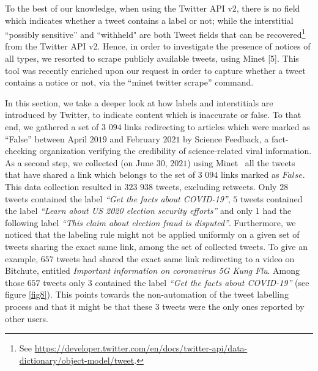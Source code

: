 \documentclass{article}
\begin{document}
\smallskip

To the best of our knowledge, when using the Twitter API v2, there is no field which indicates whether a tweet contains a label or not; while the interstitial ``possibly sensitive'' and ``withheld" are both Tweet fields that can be recovered\footnote{See \href{https://developer.twitter.com/en/docs/twitter-api/data-dictionary/object-model/tweet}{https://developer.twitter.com/en/docs/twitter-api/data-dictionary/object-model/tweet}.} from the Twitter API v2. Hence, in order to investigate the presence of notices of all types, we resorted to scrape publicly available tweets, using Minet [5]. This tool was recently enriched upon our request in order to capture whether a tweet contains a notice or not, via the ``minet twitter scrape'' command.

\smallskip

In this section, we take a deeper look at how labels and interstitials are introduced by Twitter, to indicate content which is inaccurate or false. To that end, we gathered a set of $3$ $094$ links redirecting to articles which were marked as ``False'' between April $2019$ and February $2021$ by Science Feedback, a fact-checking organization verifying the credibility of science-related viral information. 
As a second step, we collected (on June $30$, $2021$) using Minet~\cite{minet} all the tweets that have shared a link which belongs to the set of $3$ $094$ links marked as $False$. This data collection resulted in $323$ $938$ tweets, excluding retweets. Only $28$ tweets contained the label { \it ``Get the facts about COVID-19''}, $5$ tweets contained the label {\it ``Learn about US 2020 election security efforts''} and only $1$ had the following label {\it ``This claim about election fraud is disputed''}. Furthermore, we noticed that the labeling rule might not be applied uniformly on a given set of tweets sharing the exact same link, among the set of collected tweets. To give an example, $657$ tweets had shared the exact same link redirecting to a video on Bitchute, entitled {\it Important information on coronavirus 5G Kung Flu}. Among those $657$ tweets only $3$ contained the label {\it ``Get the facts about COVID-19''} (see figure \ref{fig8}). This points towards the non-automation of the tweet labelling process and that it might be that these $3$ tweets were the only ones reported by other users. 
\end{document}
